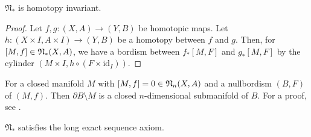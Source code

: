 \documentclass[a4paper,11pt]{article}
\begin{document}
\begin{lemma}\cite[II, Satz 3.1]{brocker}\label{htpy inv}
    \(\mathfrak{N}_\ast\) is homotopy invariant.
\end{lemma}

\begin{proof}\cite{brocker}\cite[Chapter I, 5.5]{conner}
    Let \(f,g:(X,A)\to(Y,B)\) be homotopic maps. Let \(h:(X\times I,A\times I)\to (Y,B)\) be a homotopy between \(f\) and \(g\). Then, for \([M,f]\in\mathfrak{N}_\ast(X,A)\), we have a bordism between \(f_\ast[M,F]\) and \(g_\ast[M,F]\) by the cylinder \((M\times I, h\circ (F\times\mathrm{id}_I))\).
\end{proof}



\begin{remark}%
    For a closed manifold \(M\) with \([M,f]=0\in\mathfrak{N}_n(X,A)\) and a nullbordism \((B,F)\) of \((M,f)\). Then \(\partial B\setminus M\) is a closed \(n\)-dimensional submanifold of \(B\). For a proof, see \cite[Lemma 5.4]{zhang}.
\end{remark}

\begin{lemma}\label{les}
    \(\mathfrak{N}_\ast\) satisfies the long exact sequence axiom.
\end{lemma}

\end{document}
